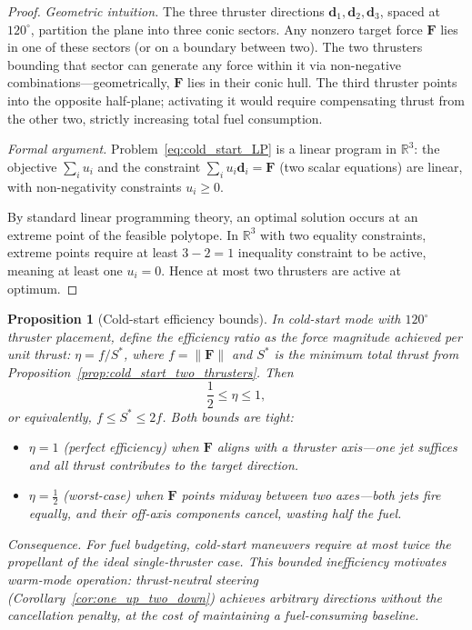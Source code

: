 \documentclass{article}
\newtheorem{proposition}{Proposition}
\begin{document}
\begin{proof}
\emph{Geometric intuition.}
The three thruster directions $\mathbf d_1, \mathbf d_2, \mathbf d_3$, spaced at $120^\circ$, 
partition the plane into three conic sectors. Any nonzero target force $\mathbf F$ lies in 
one of these sectors (or on a boundary between two). The two thrusters bounding that sector 
can generate any force within it via non-negative combinations---geometrically, $\mathbf F$ 
lies in their conic hull. The third thruster points into the opposite half-plane; activating 
it would require compensating thrust from the other two, strictly increasing total fuel 
consumption.

\emph{Formal argument.}
Problem~\eqref{eq:cold_start_LP} is a linear program in $\mathbb{R}^3$: the objective 
$\sum_i u_i$ and the constraint $\sum_i u_i \mathbf d_i = \mathbf F$ (two scalar equations) 
are linear, with non-negativity constraints $u_i \ge 0$.

By standard linear programming theory, an optimal solution occurs at an extreme point of 
the feasible polytope. In $\mathbb{R}^3$ with two equality constraints, extreme points 
require at least $3 - 2 = 1$ inequality constraint to be active, meaning at least one 
$u_i = 0$. Hence at most two thrusters are active at optimum.
\end{proof}


\begin{proposition}[Cold-start efficiency bounds]
\label{prop:cold_start_efficiency}
In cold-start mode with $120^\circ$ thruster placement, define the \emph{efficiency ratio} as 
the force magnitude achieved per unit thrust: $\eta = f / S^*$, where $f = \|\mathbf F\|$ and 
$S^*$ is the minimum total thrust from Proposition~\ref{prop:cold_start_two_thrusters}. Then
\begin{equation}
\frac{1}{2} \le \eta \le 1,
\end{equation}
or equivalently, $f \le S^* \le 2f$. Both bounds are tight:
\begin{itemize}
\item $\eta = 1$ (perfect efficiency) when $\mathbf F$ aligns with a thruster axis---one jet 
      suffices and all thrust contributes to the target direction.
\item $\eta = \tfrac{1}{2}$ (worst-case) when $\mathbf F$ points midway between two axes---both 
      jets fire equally, and their off-axis components cancel, wasting half the fuel.
\end{itemize}

\emph{Consequence.}
For fuel budgeting, cold-start maneuvers require at most twice the propellant of the ideal 
single-thruster case. This bounded inefficiency motivates warm-mode operation: thrust-neutral 
steering (Corollary~\ref{cor:one_up_two_down}) achieves arbitrary directions without the 
cancellation penalty, at the cost of maintaining a fuel-consuming baseline.
\end{proposition}
\end{document}

